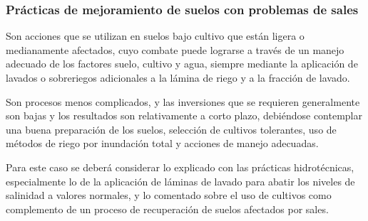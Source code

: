 \subsubsection{Prácticas de mejoramiento de suelos con problemas de sales}
Son acciones que se utilizan en suelos bajo cultivo que están ligera o medianamente afectados, cuyo combate puede lograrse a través de un manejo adecuado de los factores suelo, cultivo y agua, siempre mediante la aplicación de lavados o sobreriegos adicionales a la lámina de riego y a la fracción de lavado.

Son procesos menos complicados, y las inversiones que se requieren generalmente son bajas y los resultados son relativamente a corto plazo, debiéndose contemplar una buena preparación de los suelos, selección de cultivos tolerantes, uso de métodos de riego por inundación total y acciones de manejo adecuadas.

Para este caso se deberá considerar lo explicado con las prácticas hidrotécnicas, especialmente lo de la aplicación de láminas de lavado para abatir los niveles de salinidad a valores normales, y lo comentado sobre el uso de cultivos como complemento de un proceso de recuperación de suelos afectados por sales.


